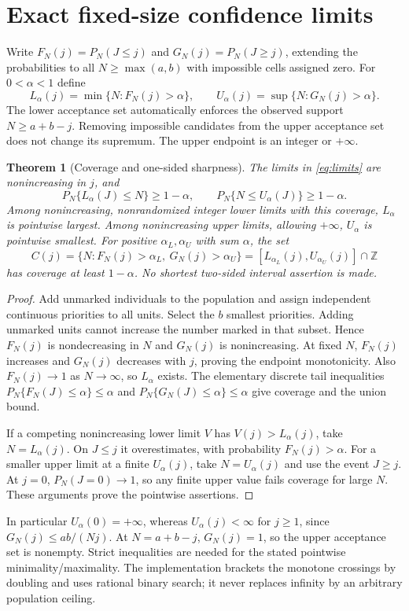 \documentclass[11pt]{article}
\newtheorem{theorem}{Theorem}[section]
\theoremstyle{remark}\newtheorem{remark}[theorem]{Remark}
\begin{document}
\section{Exact fixed-size confidence limits}
Write $F_N(j)=P_N(J\le j)$ and $G_N(j)=P_N(J\ge j)$, extending the
probabilities to all $N\ge\max(a,b)$ with impossible cells assigned zero.
For $0<\alpha<1$ define
\begin{equation}\label{eq:limits}
 L_\alpha(j)=\min\{N:F_N(j)>\alpha\},\qquad
 U_\alpha(j)=\sup\{N:G_N(j)>\alpha\}.
\end{equation}
The lower acceptance set automatically enforces the observed support
$N\ge a+b-j$. Removing impossible candidates from the upper acceptance set
does not change its supremum. The upper endpoint is an integer or $+\infty$.
\begin{theorem}[Coverage and one-sided sharpness]\label{thm:limits}
The limits in \eqref{eq:limits} are nonincreasing in $j$, and
\[
 P_N\{L_\alpha(J)\le N\}\ge1-\alpha,
 \qquad P_N\{N\le U_\alpha(J)\}\ge1-\alpha.
\]
Among nonincreasing, nonrandomized integer lower limits with this coverage,
$L_\alpha$ is pointwise largest. Among nonincreasing upper limits, allowing
$+\infty$, $U_\alpha$ is pointwise smallest.
For positive $\alpha_L,\alpha_U$ with sum $\alpha$, the set
\[
 C(j)=\{N:F_N(j)>\alpha_L,\ G_N(j)>\alpha_U\}
 =[L_{\alpha_L}(j),U_{\alpha_U}(j)]\cap\mathbb Z
\]
has coverage at least $1-\alpha$. No shortest two-sided interval assertion
is made.
\end{theorem}
\begin{proof}
Add unmarked individuals to the population and assign independent continuous
priorities to all units. Select the $b$ smallest priorities. Adding unmarked
units cannot increase the number marked in that subset. Hence $F_N(j)$ is
nondecreasing in $N$ and $G_N(j)$ is nonincreasing. At fixed $N$, $F_N(j)$
increases and $G_N(j)$ decreases with $j$, proving the endpoint monotonicity.
Also $F_N(j)\to1$ as $N\to\infty$, so $L_\alpha$ exists.
The elementary discrete tail inequalities
$P_N\{F_N(J)\le\alpha\}\le\alpha$ and
$P_N\{G_N(J)\le\alpha\}\le\alpha$ give coverage and the union bound.

If a competing nonincreasing lower limit $V$ has
$V(j)>L_\alpha(j)$, take $N=L_\alpha(j)$. On $J\le j$ it overestimates,
with probability $F_N(j)>\alpha$. For a smaller upper limit at a finite
$U_\alpha(j)$, take $N=U_\alpha(j)$ and use the event $J\ge j$.
At $j=0$, $P_N(J=0)\to1$, so any finite upper value fails coverage for
large $N$. These arguments prove the pointwise assertions.
\end{proof}
In particular $U_\alpha(0)=+\infty$, whereas $U_\alpha(j)<\infty$ for
$j\ge1$, since $G_N(j)\le ab/(Nj)$. At $N=a+b-j$, $G_N(j)=1$, so the
upper acceptance set is nonempty. Strict inequalities are needed for the
stated pointwise minimality/maximality. The implementation brackets the
monotone crossings by doubling and uses rational binary search; it never
replaces infinity by an arbitrary population ceiling.
\end{document}
